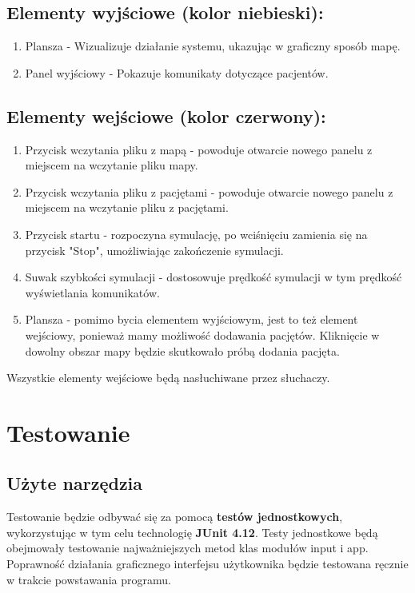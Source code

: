 \documentclass{article}
\begin{document}
    \subsection{Elementy wyjściowe (kolor niebieski):}
    \begin{enumerate}
        \item Plansza - Wizualizuje działanie systemu, ukazując w graficzny sposób mapę.
        \item Panel wyjściowy - Pokazuje komunikaty dotyczące pacjentów.
    \end{enumerate}
    \subsection{Elementy wejściowe (kolor czerwony):}
    \begin{enumerate}
        \item Przycisk wczytania pliku z mapą - powoduje otwarcie nowego panelu z miejscem na wczytanie pliku mapy.
        \item Przycisk wczytania pliku z pacjętami - powoduje otwarcie nowego panelu z miejscem na wczytanie pliku z pacjętami.
        \item Przycisk startu - rozpoczyna symulację, po wciśnięciu zamienia się na przycisk "Stop", umożliwiając zakończenie symulacji.
        \item Suwak szybkości symulacji - dostosowuje prędkość symulacji w tym prędkość wyświetlania komunikatów.
        \item Plansza - pomimo bycia elementem wyjściowym, jest to też element wejściowy, ponieważ mamy możliwość dodawania pacjętów. Kliknięcie w dowolny obszar mapy będzie skutkowało próbą dodania pacjęta.
    \end{enumerate}
    Wszystkie elementy wejściowe będą nasłuchiwane przez słuchaczy.

\section{Testowanie}
    \subsection{Użyte narzędzia}
    Testowanie będzie odbywać się za pomocą \textbf{testów jednostkowych}, wykorzystując w tym celu technologię \textbf{JUnit 4.12}. Testy jednostkowe będą obejmowały testowanie najważniejszych metod klas modułów input i app. Poprawność działania graficznego interfejsu użytkownika będzie testowana ręcznie w trakcie powstawania programu.
\end{document}
